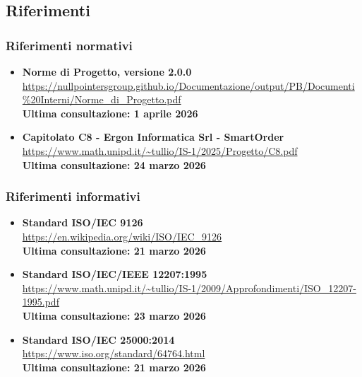 \subsection{Riferimenti}
\subsubsection{Riferimenti normativi}

\begin{itemize}[itemsep=5pt, parsep=5pt, label=$\scriptstyle\bullet$]
	
	\item \textbf{Norme di Progetto, versione 2.0.0}\\
	\url{https://nullpointersgroup.github.io/Documentazione/output/PB/Documenti%20Interni/Norme_di_Progetto.pdf}\\[3pt]
	\textbf{Ultima consultazione: 1 aprile 2026}
	
	\item \textbf{Capitolato C8 - Ergon Informatica Srl - SmartOrder}\\
	\url{https://www.math.unipd.it/~tullio/IS-1/2025/Progetto/C8.pdf}\\[3pt]
	\textbf{Ultima consultazione: 24 marzo 2026}
	
\end{itemize}

\subsubsection{Riferimenti informativi}
\begin{itemize}[itemsep=5pt, parsep=5pt, label=$\scriptstyle\bullet$]
	
	\item \textbf{Standard ISO/IEC 9126}\\
	\url{https://en.wikipedia.org/wiki/ISO/IEC_9126}\\[3pt]
	\textbf{Ultima consultazione: 21 marzo 2026}
	
	\item \textbf{Standard ISO/IEC/IEEE 12207:1995}\\
	\url{https://www.math.unipd.it/~tullio/IS-1/2009/Approfondimenti/ISO_12207-1995.pdf}\\[3pt]
	\textbf{Ultima consultazione: 23 marzo 2026}
	
	\item \textbf{Standard ISO/IEC 25000:2014}\\
	\url{https://www.iso.org/standard/64764.html}\\
	\textbf{Ultima consultazione: 21 marzo 2026}
	
\end{itemize}
